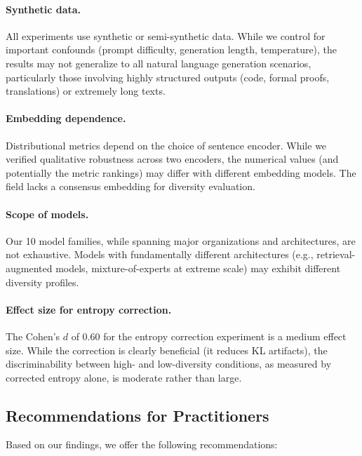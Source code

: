 \documentclass[11pt,a4paper]{article}
\begin{document}
\paragraph{Synthetic data.}
All experiments use synthetic or semi-synthetic data.
While we control for important confounds (prompt
difficulty, generation length, temperature), the
results may not generalize to all natural language
generation scenarios, particularly those involving
highly structured outputs (code, formal proofs,
translations) or extremely long texts.

\paragraph{Embedding dependence.}
Distributional metrics depend on the choice of sentence
encoder.  While we verified qualitative robustness
across two encoders, the numerical values (and
potentially the metric rankings) may differ with
different embedding models.  The field lacks a
consensus embedding for diversity evaluation.

\paragraph{Scope of models.}
Our 10 model families, while spanning major
organizations and architectures, are not exhaustive.
Models with fundamentally different architectures
(e.g., retrieval-augmented models, mixture-of-experts
at extreme scale) may exhibit different diversity
profiles.

\paragraph{Effect size for entropy correction.}
The Cohen's $d$ of 0.60 for the entropy correction
experiment is a medium effect size.  While the
correction is clearly beneficial (it reduces KL
artifacts), the discriminability between high- and
low-diversity conditions, as measured by corrected
entropy alone, is moderate rather than large.

\subsection{Recommendations for Practitioners}

Based on our findings, we offer the following
recommendations:
\end{document}
